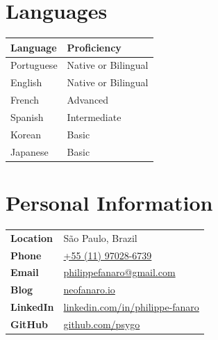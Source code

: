 \documentclass[12pt]{extarticle}
\renewcommand{\_}{\leavevmode\kern.06em\vbox{\hrule width.425em}}
\begin{document}
\noindent
\begin{minipage}[t]{0.48\textwidth}
\section{Languages}

\renewcommand{\arraystretch}{1.25}
\setlength{\tabcolsep}{0.5cm}

\begin{tabular}{ l | l  }
  \textbf{Language} & \textbf{Proficiency} \\
  \hline\hline
  Portuguese & Native or Bilingual \\
  English & Native or Bilingual \\
  French & Advanced \\
  Spanish & Intermediate \\
  Korean & Basic \\
  Japanese & Basic
\end{tabular}
\end{minipage}%
\hfill
\begin{minipage}[t]{0.48\textwidth}
\section{Personal Information}

\small
\renewcommand{\arraystretch}{1.25}
\setlength{\tabcolsep}{0.2cm}

\begin{tabular}{ l | l }
  \textbf{Location} & S\~ao Paulo, Brazil \\
  \textbf{Phone} & \href{tel:+5511970286739}{+55 (11) 97028-6739} \\
  \textbf{Email} & \href{mailto:philippefanaro@gmail.com}{philippefanaro@gmail.com} \\
  \textbf{Blog} & \href{https://neofanaroio.vercel.app/}{neofanaro.io} \\
  \textbf{LinkedIn} & \href{https://www.linkedin.com/in/philippe-fanaro/}{linkedin.com/in/philippe-fanaro} \\
  \textbf{GitHub} & \href{https://github.com/psygo}{github.com/psygo}
\end{tabular}
\normalsize
\end{minipage}
\end{document}
